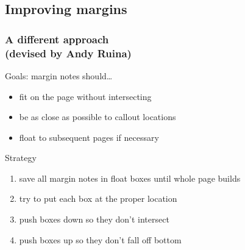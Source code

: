 \documentclass{beamer}
\begin{document}
\subsection{Improving margins}
\begin{frame}
  \frametitle{A different approach\\\normalsize(devised by Andy Ruina)}
  \begin{block}{Goals: margin notes should\ldots}
    \begin{itemize}
    \item fit on the page without intersecting
    \item be as close as possible to callout locations
    \item float to subsequent pages if necessary
    \end{itemize}
  \end{block}
  \begin{block}{Strategy}
    \begin{enumerate}
      \addtocounter{enumi}{-1}
    \item save all margin notes in float boxes until whole page builds
    \item try to put each box at the proper location
    \item push boxes down so they don't intersect
    \item push boxes up so they don't fall off bottom
    \end{enumerate}
  \end{block}
\end{frame}
\end{document}
